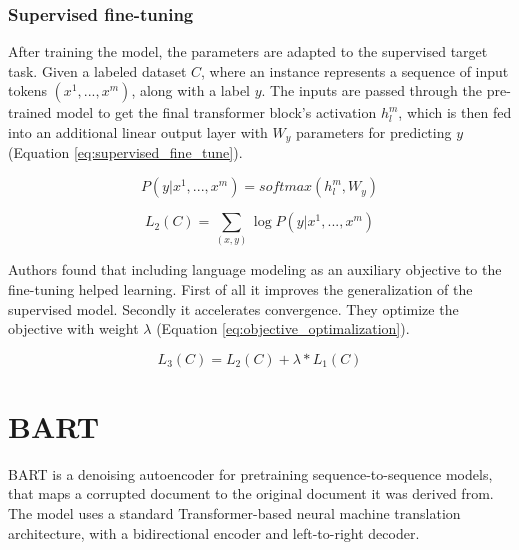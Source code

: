 \subsubsection{Supervised fine-tuning}
After training the model, the parameters are adapted to the supervised target task. Given a labeled dataset $C$, where an instance represents a sequence of input tokens $(x^1, ... , x^m)$, along with a label $y$. The inputs are passed through the pre-trained model to get the final transformer block's activation $h_l^m$, which is then fed into an additional linear output layer with $W_y$ parameters for predicting $y$ (Equation \ref{eq:supervised_fine_tune}). 

\begin{equation} \label{eq:supervised_fine_tune}
P(y|x^1, ... , x^m) = softmax(h_l^m, W_y)
\end{equation}

\begin{equation} \label{eq:supervised_maximize}
L_2(C) = \sum_{(x,y)} \log P(y|x^1, ... , x^m)
\end{equation}

Authors found that including language modeling as an auxiliary objective to the fine-tuning helped learning. First of all it improves the generalization of the supervised model. Secondly it accelerates convergence. They optimize the objective with weight $\lambda$ (Equation \ref{eq:objective_optimalization}).

\begin{equation} \label{eq:objective_optimalization}
L_3(C) = L_2(C) + \lambda * L_1(C)
\end{equation}

\section{BART} \label{bart_section}
BART is a denoising autoencoder for pretraining sequence-to-sequence models, that maps a corrupted document to the original document it was derived from. The model uses a standard Transformer-based neural machine translation architecture, with a bidirectional encoder and left-to-right decoder.

